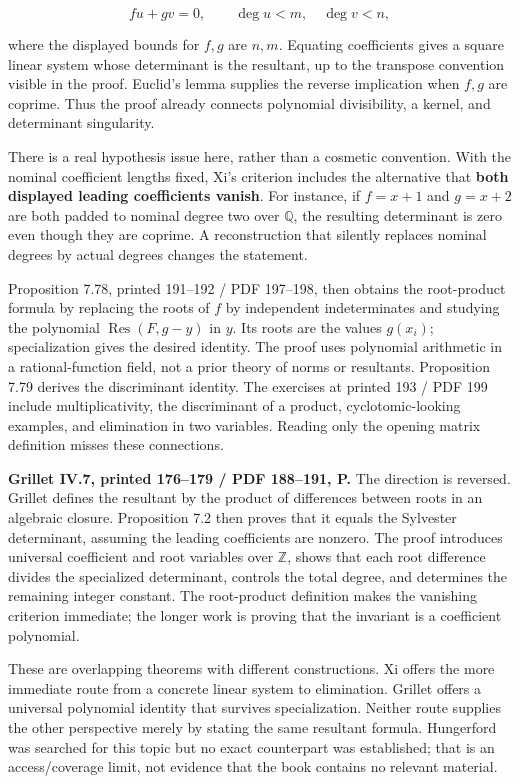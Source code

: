 \documentclass[
  11pt,
]{article}
\begin{document}
\[
f u+g v=0,\qquad \deg u<m,\quad \deg v<n,
\]

where the displayed bounds for \(f,g\) are \(n,m\). Equating
coefficients gives a square linear system whose determinant is the
resultant, up to the transpose convention visible in the proof. Euclid's
lemma supplies the reverse implication when \(f,g\) are coprime. Thus
the proof already connects polynomial divisibility, a kernel, and
determinant singularity.

There is a real hypothesis issue here, rather than a cosmetic
convention. With the nominal coefficient lengths fixed, Xi's criterion
includes the alternative that \textbf{both displayed leading
coefficients vanish}. For instance, if \(f=x+1\) and \(g=x+2\) are both
padded to nominal degree two over \(\mathbb Q\), the resulting
determinant is zero even though they are coprime. A reconstruction that
silently replaces nominal degrees by actual degrees changes the
statement.

Proposition 7.78, printed 191--192 / PDF 197--198, then obtains the
root-product formula by replacing the roots of \(f\) by independent
indeterminates and studying the polynomial \(\operatorname{Res}(F,g-y)\)
in \(y\). Its roots are the values \(g(x_i)\); specialization gives the
desired identity. The proof uses polynomial arithmetic in a
rational-function field, not a prior theory of norms or resultants.
Proposition 7.79 derives the discriminant identity. The exercises at
printed 193 / PDF 199 include multiplicativity, the discriminant of a
product, cyclotomic-looking examples, and elimination in two variables.
Reading only the opening matrix definition misses these connections.

\textbf{Grillet IV.7, printed 176--179 / PDF 188--191, P.} The direction
is reversed. Grillet defines the resultant by the product of differences
between roots in an algebraic closure. Proposition 7.2 then proves that
it equals the Sylvester determinant, assuming the leading coefficients
are nonzero. The proof introduces universal coefficient and root
variables over \(\mathbb Z\), shows that each root difference divides
the specialized determinant, controls the total degree, and determines
the remaining integer constant. The root-product definition makes the
vanishing criterion immediate; the longer work is proving that the
invariant is a coefficient polynomial.

These are overlapping theorems with different constructions. Xi offers
the more immediate route from a concrete linear system to elimination.
Grillet offers a universal polynomial identity that survives
specialization. Neither route supplies the other perspective merely by
stating the same resultant formula. Hungerford was searched for this
topic but no exact counterpart was established; that is an
access/coverage limit, not evidence that the book contains no relevant
material.
\end{document}
